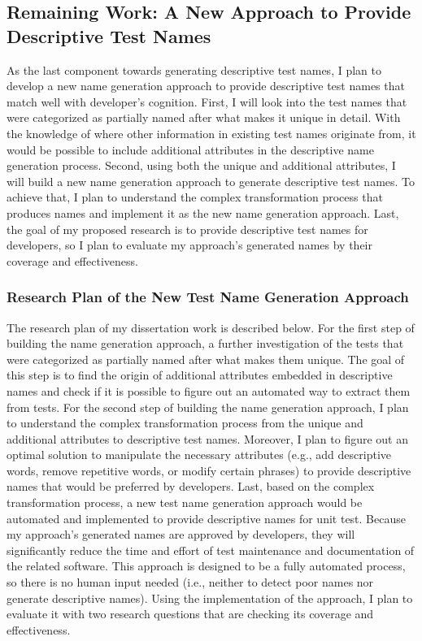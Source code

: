 \subsection{Remaining Work: A New Approach to Provide Descriptive Test Names}
\label{sec:remaining-work}

As the last component towards generating descriptive test names, I plan to develop a new name generation approach to provide descriptive test names that match well with developer's cognition.
%
First, I will look into the test names that were categorized as partially named after what makes it unique in detail.
%
With the knowledge of where other information in existing test names originate from, it would be possible to include additional attributes in the descriptive name generation process.
%
Second, using both the unique and additional attributes, I will build a new name generation approach to generate descriptive test names.
%
To achieve that, I plan to understand the complex transformation process that produces names and implement it as the new name generation approach.
%
Last, the goal of my proposed research is to provide descriptive test names for developers, so I plan to evaluate my approach's generated names by their coverage and effectiveness.

\subsubsection{Research Plan of the New Test Name Generation Approach}

The research plan of my dissertation work is described below.
%
For the first step of building the name generation approach, a further investigation of the tests that were categorized as partially named after what makes them unique.
%
The goal of this step is to find the origin of additional attributes embedded in descriptive names and check if it is possible to figure out an automated way to extract them from tests.
%
For the second step of building the name generation approach, I plan to understand the complex transformation process from the unique and additional attributes to descriptive test names.
%
Moreover, I plan to figure out an optimal solution to manipulate the necessary attributes (e.g., add descriptive words, remove repetitive words, or modify certain phrases) to provide descriptive names that would be preferred by developers.
%
Last, based on the complex transformation process, a new test name generation approach would be automated and implemented to provide descriptive names for unit test.
%
Because my approach's generated names are approved by developers, they will significantly reduce the time and effort of test maintenance and documentation of the related software.
%
This approach is designed to be a fully automated process, so there is no human input needed (i.e., neither to detect poor names nor generate descriptive names).
%
Using the implementation of the approach, I plan to evaluate it with two research questions that are checking its coverage and effectiveness.


